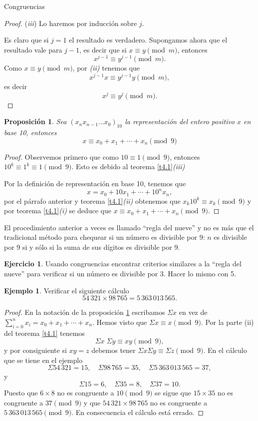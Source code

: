 \documentclass[11pt,spanish,makeidx]{amsbook}
\newtheorem{proposicion}[teorema]{Proposici\'on}
\theoremstyle{definition}
\newtheorem{ejemplo}{Ejemplo}[section]
\newtheorem{ejercicio}{Ejercicio}[section]
\theoremstyle{remark}
\begin{document}
\begin{section}{Congruencias}
\begin{proof}
({\em iii}) Lo haremos por inducción sobre $j$. 

Es claro que si $j=1$ el resultado es verdadero. Supongamos ahora que el resultado vale para $j-1$, es decir que si  $x \equiv y \pmod{m}$, entonces 
$$
x^{j-1} \equiv y^{j-1} \pmod{m}.
$$
Como $x \equiv y \pmod{m}$,  por   {\em (ii)} tenemos que 
$$
x^{j-1}x \equiv y^{j-1}y  \pmod{m},
$$
es decir 
$$
x^j \equiv y^j \pmod{m}.
$$
\end{proof}

\begin{proposicion}\label{prop412} Sea $(x_nx_{n-1}\ldots x_0)_{10}$ la representación del entero positivo $x$ en base 10, entonces
$$
x \equiv x_0+x_1+\cdots+x_n \pmod{9}
$$
\end{proposicion}
\begin{proof}
 Observemos primero que como $10\equiv 1\pmod{9}$, entonces  $10^k\equiv 1^k \equiv 1\pmod{9}$. Esto es debido  al teorema \ref{t4.1}{\em (iii)} 

Por la definición de representación en base 10, tenemos que 
$$
x=x_0 + 10x_1+ \cdots+10^nx_n,
$$ 
por el párrafo anterior y teorema \ref{t4.1}{\em (ii)}  obtenemos que $x_k10^k \equiv x_k \pmod{9}$ y por teorema \ref{t4.1}{\em (i)} se deduce que $x \equiv x_0+x_1+\cdots+x_n \pmod{9}$.
\end{proof}

El procedimiento anterior a veces es llamado ``regla del nueve''   y no es más que el tradicional método para chequear si un número es divisible por 9: $n$ es divisible por 9 si y sólo si la suma de sus dígitos es divisible por 9.  

\begin{ejercicio}
	Usando congruencias encontrar criterios similares  a la ``regla del nueve'' para verificar si un número es divisible por 3. Hacer lo mismo con 5. 
\end{ejercicio}

\begin{ejemplo} Verificar  el siguiente cálculo
$$
54\,321 \times 98\,765= 5\,363\,013\,565.
$$
\end{ejemplo}
\begin{proof}
En la notación de la proposición \ref{prop412} escribamos $\Sigma x$ en vez de $ \sum_{i=0}^n x_i = x_0+x_1+\cdots+x_n$. Hemos visto que $\Sigma x \equiv x \pmod{9}$. Por la parte (ii) del teorema \ref{t4.1} tenemos
$$
\Sigma x\;\Sigma y \equiv xy \pmod{9},
$$
y por consiguiente si $xy=z$ debemos tener $\Sigma x\Sigma y \equiv\Sigma z \pmod{9}$. En el cálculo que se tiene en el ejemplo
$$
\Sigma 54\,321=15,\quad \Sigma 98\,765=35,\quad
\Sigma 5\,363\,013\,565=37,
$$
y
$$
\Sigma 15=6, \quad \Sigma 35=8,\quad \Sigma 37=10.
$$
Puesto que $6 \times 8$ no es congruente a $10 \pmod{9}$ se sigue que $15 \times 35$ no es congruente a $37 \pmod{9}$ y que $54\,321 \times 98\,765$ no es congruente a $5\,363\,013\,565\pmod{9}$. En consecuencia el cálculo está errado.
\end{proof}


\end{section}
\end{document}
